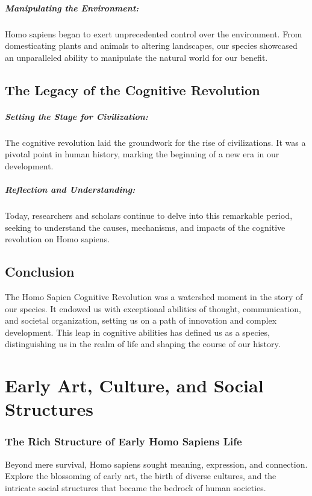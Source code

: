 \documentclass[a4paper,12pt]{book}
\begin{document}
\paragraph{Manipulating the Environment:}
Homo sapiens began to exert unprecedented control over the environment. From domesticating plants and animals to altering landscapes, our species showcased an unparalleled ability to manipulate the natural world for our benefit.

\section*{The Legacy of the Cognitive Revolution}

\paragraph{Setting the Stage for Civilization:}
The cognitive revolution laid the groundwork for the rise of civilizations. It was a pivotal point in human history, marking the beginning of a new era in our development.

\paragraph{Reflection and Understanding:}
Today, researchers and scholars continue to delve into this remarkable period, seeking to understand the causes, mechanisms, and impacts of the cognitive revolution on Homo sapiens.

\section*{Conclusion}

The Homo Sapien Cognitive Revolution was a watershed moment in the story of our species. It endowed us with exceptional abilities of thought, communication, and societal organization, setting us on a path of innovation and complex development. This leap in cognitive abilities has defined us as a species, distinguishing us in the realm of life and shaping the course of our history.

\chapter{Early Art, Culture, and Social Structures}
\subsection*{The Rich Structure of Early Homo Sapiens Life}
Beyond mere survival, Homo sapiens sought meaning, expression, and connection. Explore the blossoming of early art, the birth of diverse cultures, and the intricate social structures that became the bedrock of human societies.
\end{document}
